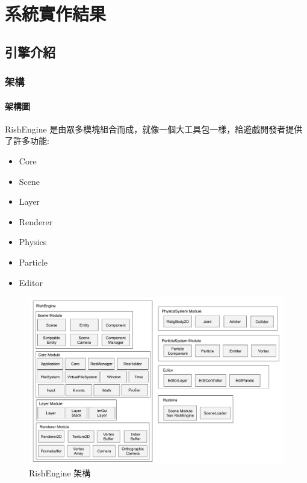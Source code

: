 \chapter{系統實作結果}

\section{引擎介紹}

\subsection{架構}
\label{sub:架構}


\subsubsection{架構圖}
\label{ssub:架構圖}

RishEngine 是由眾多模塊組合而成，就像一個大工具包一樣，給遊戲開發者提供了許多功能:

\begin{itemize}
\item{Core}
\item{Scene}
\item{Layer}
\item{Renderer}
\item{Physics}
\item{Particle}
\item{Editor}
\end{itemize}

\begin{figure}[h]
    \begin{center}
    \includegraphics[width=\textwidth]{./resources/RishEngine_arch.png}
    \end{center}
\caption{RishEngine 架構}
\label{fig:RishEngineArch}
\end{figure}

